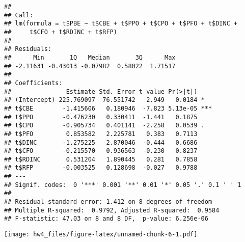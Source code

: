 \documentclass[]{article}
\newenvironment{Shaded}{\begin{snugshade}}{\end{snugshade}}
\newcommand{\KeywordTok}[1]{\textcolor[rgb]{0.13,0.29,0.53}{\textbf{#1}}}
\newcommand{\DataTypeTok}[1]{\textcolor[rgb]{0.13,0.29,0.53}{#1}}
\newcommand{\StringTok}[1]{\textcolor[rgb]{0.31,0.60,0.02}{#1}}
\newcommand{\OperatorTok}[1]{\textcolor[rgb]{0.81,0.36,0.00}{\textbf{#1}}}
\newcommand{\NormalTok}[1]{#1}
\begin{document}
\begin{verbatim}
## 
## Call:
## lm(formula = t$PBE ~ t$CBE + t$PPO + t$CPO + t$PFO + t$DINC + 
##     t$CFO + t$RDINC + t$RFP)
## 
## Residuals:
##      Min       1Q   Median       3Q      Max 
## -2.11631 -0.43013 -0.07982  0.58022  1.71517 
## 
## Coefficients:
##               Estimate Std. Error t value Pr(>|t|)    
## (Intercept) 225.769097  76.551742   2.949   0.0184 *  
## t$CBE        -1.415606   0.180946  -7.823 5.13e-05 ***
## t$PPO        -0.476230   0.330411  -1.441   0.1875    
## t$CPO        -0.905734   0.401141  -2.258   0.0539 .  
## t$PFO         0.853582   2.225781   0.383   0.7113    
## t$DINC       -1.275225   2.870046  -0.444   0.6686    
## t$CFO        -0.215570   0.936563  -0.230   0.8237    
## t$RDINC       0.531204   1.890445   0.281   0.7858    
## t$RFP        -0.003525   0.128698  -0.027   0.9788    
## ---
## Signif. codes:  0 '***' 0.001 '**' 0.01 '*' 0.05 '.' 0.1 ' ' 1
## 
## Residual standard error: 1.412 on 8 degrees of freedom
## Multiple R-squared:  0.9792, Adjusted R-squared:  0.9584 
## F-statistic: 47.03 on 8 and 8 DF,  p-value: 6.256e-06
\end{verbatim}

\begin{Shaded}
\end{Shaded}

\texttt{[image: hw4\_files/figure-latex/unnamed-chunk-6-1.pdf]}
\end{document}
